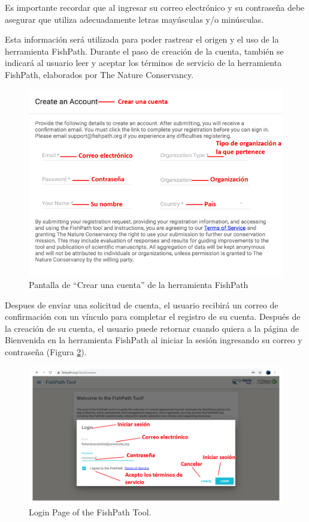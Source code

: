 \documentclass[
  11pt,
]{book}
\begin{document}
Es importante recordar que al ingresar su correo electrónico y su contraseña debe asegurar que utiliza adecuadamente letras mayúsculas y/o minúsculas.

Esta información será utilizada para poder rastrear el origen y el uso de la herramienta FishPath. Durante el paso de creación de la cuenta, también se indicará al usuario leer y aceptar los términos de servicio de la herramienta FishPath, elaborados por The Nature Conservancy.

\begin{figure}

{\centering \includegraphics[width=0.95\linewidth]{images/create-account-es} 

}

\caption{Pantalla de “Crear una cuenta” de la herramienta FishPath}\label{fig:create-account}
\end{figure}

Despues de enviar una solicitud de cuenta, el usuario recibirá un correo de confirmación con un vínculo para completar el registro de su cuenta. Después de la creación de su cuenta, el usuario puede retornar cuando quiera a la página de Bienvenida en la herramienta FishPath al iniciar la sesión ingresando su correo y contraseña (Figura \ref{fig:login-page}).

\begin{figure}

{\centering \includegraphics[width=0.95\linewidth]{images/login-page-es} 

}

\caption{Login Page of the FishPath Tool.}\label{fig:login-page}
\end{figure}
\end{document}
